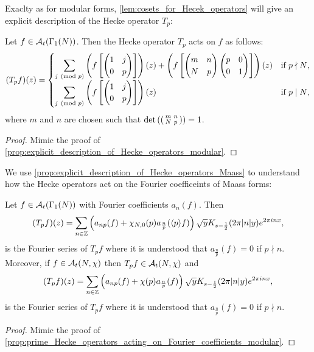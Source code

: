       Exaclty as for modular forms, \cref{lem:cosets_for_Hecek_operators} will give an explicit description of the Hecke operator $T_{p}$:

      \begin{proposition}\label{prop:explicit_description_of_Hecke_operators_Maass}
        Let $f \in \mathcal{A}_{t}(\Gamma_{1}(N))$. Then the Hecke operator $T_{p}$ acts on $f$ as follows:
        \[
          (T_{p}f)(z) = \begin{cases} \displaystyle{\sum_{j \ \left(\text{mod }p\right)}}\left(f\left[\begin{pmatrix} 1 & j \\ 0 & p \end{pmatrix}\right]\right)(z)+\left(f\left[\begin{pmatrix} m & n \\ N & p \end{pmatrix}\begin{pmatrix} p & 0 \\ 0 & 1 \end{pmatrix}\right]\right)(z) & \text{if $p \nmid N$}, \\ \displaystyle{\sum_{j \ \left(\text{mod }p\right)}}\left(f\left[\begin{pmatrix} 1 & j \\ 0 & p \end{pmatrix}\right]\right)(z) & \text{if $p \mid N$}, \end{cases}
        \]
        where $m$ and $n$ are chosen such that $\det\left(\begin{psmallmatrix} m & n \\ N & p \end{psmallmatrix}\right) = 1$.
      \end{proposition}
      \begin{proof}
        Mimic the proof of \cref{prop:explicit_description_of_Hecke_operators_modular}.
      \end{proof}

      We use \cref{prop:explicit_description_of_Hecke_operators_Maass} to understand how the Hecke operators act on the Fourier coefficeints of Maass forms:

      \begin{proposition}\label{prop:prime_Hecke_operators_acting_on_Fourier_coefficients_Maass}
        Let $f \in \mathcal{A}_{t}(\Gamma_{1}(N))$ with Fourier coefficients $a_{n}(f)$. Then
        \[
          (T_{p}f)(z) = \sum_{n \in \mathbb{Z}}\left(a_{np}(f)+\chi_{N,0}(p)a_{\frac{n}{p}}(\langle p\rangle f)\right)\sqrt{y}K_{s-\frac{1}{2}}(2\pi|n|y)e^{2\pi inx},
        \]
        is the Fourier series of $T_{p}f$ where it is understood that $a_{\frac{n}{p}}(f) = 0$ if $p \nmid n$. Moreover, if $f \in \mathcal{A}_{t}(N,\chi)$ then $T_{p}f \in \mathcal{A}_{t}(N,\chi)$ and
        \[
          (T_{p}f)(z) = \sum_{n \in \mathbb{Z}}\left(a_{np}(f)+\chi(p)a_{\frac{n}{p}}(f)\right)\sqrt{y}K_{s-\frac{1}{2}}(2\pi|n|y)e^{2\pi inx},
        \]
        is the Fourier series of $T_{p}f$ where it is understood that $a_{\frac{n}{p}}(f) = 0$ if $p \nmid n$.
      \end{proposition}
      \begin{proof}
        Mimic the proof of \cref{prop:prime_Hecke_operators_acting_on_Fourier_coefficients_modular}.
      \end{proof}

